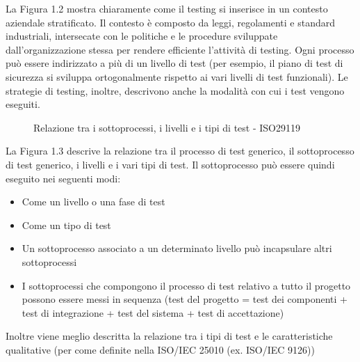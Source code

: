 La Figura 1.2 mostra chiaramente come il testing si inserisce in un contesto aziendale stratificato.
Il contesto è composto da leggi, regolamenti e standard industriali, intersecate con le politiche e le procedure sviluppate dall'organizzazione stessa per rendere efficiente l'attività di testing.
Ogni processo può essere indirizzato a più di un livello di test (per esempio, il piano di test di sicurezza si sviluppa ortogonalmente rispetto ai vari livelli di test funzionali).
Le strategie di testing, inoltre, descrivono anche la modalità con cui i test vengono eseguiti.\cite{iso29119}
\begin{figure}[H]
\centering
{}
\caption{Relazione tra i sottoprocessi, i livelli e i tipi di test - ISO29119\cite{iso29119}}\label{fig:3}
\end{figure}
La Figura 1.3 descrive la relazione tra il processo di test generico, il sottoprocesso di test generico, i livelli e i vari tipi di test.
Il sottoprocesso può essere quindi eseguito nei seguenti modi:
\begin{itemize}
\item Come un livello o una fase di test
\item Come un tipo di test
\item Un sottoprocesso associato a un determinato livello può incapsulare altri sottoprocessi
\item I sottoprocessi che compongono il processo di test relativo a tutto il progetto possono essere messi in sequenza (test del progetto = test dei componenti + test di integrazione + test del sistema + test di accettazione)
\end{itemize}
Inoltre viene meglio descritta la relazione tra i tipi di test e le caratteristiche qualitative (per come definite nella ISO/IEC 25010 (ex. ISO/IEC 9126))\cite{iso29119}
